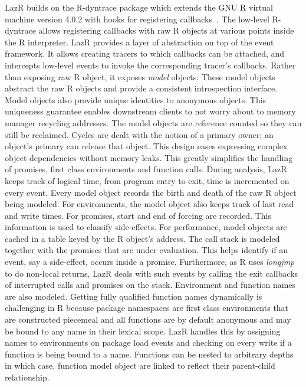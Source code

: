 \documentclass[review,nonacm,screen,acmsmall,anonymous=true]{acmart}
\newcommand{\rdyn}{{\sf R-dyntrace}\xspace}
\newcommand{\lazr}{{\sf LazR}\xspace}
\begin{document}
\lazr builds on the \rdyn package which extends the GNU R virtual machine
version 4.0.2 with hooks for registering callbacks~\cite{oopsla19b}. The
low-level \rdyn allows registering callbacks with raw R objects at various
points inside the R interpreter. \lazr provides a layer of abstraction on top of
the event framework. It allows creating tracers to which callbacks can be
attached, and intercepts low-level events to invoke the corresponding tracer's
callbacks. Rather than exposing raw R object, it exposes \emph{model} objects.
These model objects abstract the raw R objects and provide a consistent
introspection interface. Model objects also provide unique identities to
anonymous objects. This uniqueness guarantee enables downstream clients to not
worry about to memory manager recycling addresses. The model objects are
reference counted so they can still be reclaimed. Cycles are dealt with the
notion of a primary owner; an object's primary can release that object. This
design eases expressing complex object dependencies without memory leaks. This
greatly simplifies the handling of promises, first class environments and
function calls. During analysis, \lazr keeps track of logical time, from program
entry to exit, time is incremented on every event. Every model object records
the birth and death of the raw R object being modeled. For environments, the
model object also keeps track of last read and write times. For promises, start
and end of forcing are recorded. This information is used to classify
side-effects.
%
For performance, model objects are cached in a table keyed by the R object's
address. The call stack is modeled together with the promises that are under
evaluation. This helps identify if an event, say a side-effect, occurs inside a
promise. Furthermore, as R uses \emph{longjmp} to do non-local returns, \lazr
deals with such events by calling the exit callbacks of interrupted calls and
promises on the stack. Environment and function names are also modeled. Getting
fully qualified function names dynamically is challenging in R because package
namespaces are first class environments that are constructed piecemeal and all
functions are by default anonymous and may be bound to any name in their lexical
scope. \lazr handles this by assigning names to environments on package load
events and checking on every write if a function is being bound to a name.
Functions can be nested to arbitrary depths in which case, function model object
are linked to reflect their parent-child relationship.
\end{document}
